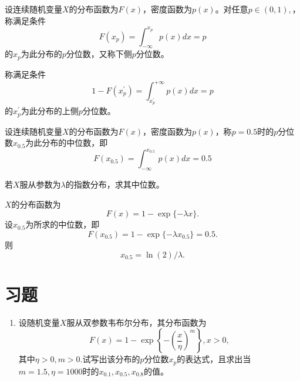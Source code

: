 \begin{definition}\label{def:quantile}
设连续随机变量$X$的分布函数为$F(x)$，密度函数为$p(x)$。对任意$ p \in(0,1),$，称满足条件
$$F\left(x_{p}\right)=\int_{-\infty}^{x_{p}} p(x) d x=p$$
的$x_{p}$为此分布的$p$分位数，又称下侧$p$分位数。

称满足条件
$$1-F\left(x_{p}^{\prime}\right)=\int_{x_{p}^{\prime}}^{+\infty} p(x) d x=p$$
的$x_{p}^{\prime}$为此分布的上侧$p$分位数。
\end{definition}


\begin{definition}
设连续随机变量$X$的分布函数为$F(x)$，密度函数为$p(x)$，称$p=0.5$时的$p$分位数$x_{0.5}$为此分布的中位数，即
$$F\left(x_{0.5}\right)=\int_{-\infty}^{x_{0.5}} p(x) d x=0.5$$
\end{definition}

\begin{example}
    若$X$服从参数为$\lambda$的指数分布，求其中位数。
\end{example}
\begin{solution}
    $X$的分布函数为
    $$
    F(x) = 1 - \exp\{-\lambda x\}.
    $$
    设$x_{0.5}$为所求的中位数，即
    $$F(x_{0.5}) =  1 - \exp\{-\lambda x_{0.5}\} = 0.5.$$
    则
    $$
    x_{0.5} = \ln(2)/\lambda.
    $$
\end{solution}

\section{习题}

    \begin{enumerate}


\item 设随机变量$X$服从双参数韦布尔分布，其分布函数为
$$
	    F(x) = 1-\exp \left \{-\left (\frac{x}{\eta} \right )^m \right \}, x>0,
$$
其中$\eta > 0,m > 0$.试写出该分布的$p$分位数$x_p$的表达式，且求出当$m = 1.5,\eta = 1000$时的$x_{0.1},x_{0.5},x_{0.8}$的值。

\end{enumerate}